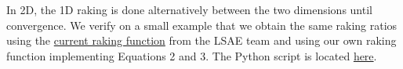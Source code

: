 \documentclass{tex/note}
\begin{document}
\vspace{1em}

In 2D, the 1D raking is done alternatively between the two dimensions until convergence. We verify on a small example that we obtain the same raking ratios using the \href{https://stash.ihme.washington.edu/projects/LSAE/repos/sae.shared/browse/R/rake.r}{current raking function} from the LSAE team and using our own raking function implementing Equations 2 and 3. The Python script is located \href{https://github.com/ADucellierIHME/raking_IPF/blob/main/compare_with_current_raking_function.py}{here}.


\end{document}
